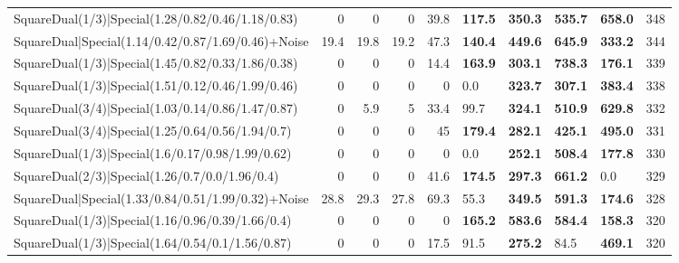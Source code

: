 \begin{tabular}{lrrrrllllr}
 SquareDual(1/3)|Special(1.28/0.82/0.46/1.18/0.83)       &          0   &          0   &          0   &            39.8 & \textbf{117.5} & \textbf{350.3} & \textbf{535.7} & \textbf{658.0}  &          348 \\
 SquareDual|Special(1.14/0.42/0.87/1.69/0.46)+Noise      &         19.4 &         19.8 &         19.2 &            47.3 & \textbf{140.4} & \textbf{449.6} & \textbf{645.9} & \textbf{333.2}  &          344 \\
 SquareDual(1/3)|Special(1.45/0.82/0.33/1.86/0.38)       &          0   &          0   &          0   &            14.4 & \textbf{163.9} & \textbf{303.1} & \textbf{738.3} & \textbf{176.1}  &          339 \\
 SquareDual(1/3)|Special(1.51/0.12/0.46/1.99/0.46)       &          0   &          0   &          0   &             0   & 0.0            & \textbf{323.7} & \textbf{307.1} & \textbf{383.4}  &          338 \\
 SquareDual(3/4)|Special(1.03/0.14/0.86/1.47/0.87)       &          0   &          5.9 &          5   &            33.4 & 99.7           & \textbf{324.1} & \textbf{510.9} & \textbf{629.8}  &          332 \\
 SquareDual(3/4)|Special(1.25/0.64/0.56/1.94/0.7)        &          0   &          0   &          0   &            45   & \textbf{179.4} & \textbf{282.1} & \textbf{425.1} & \textbf{495.0}  &          331 \\
 SquareDual(1/3)|Special(1.6/0.17/0.98/1.99/0.62)        &          0   &          0   &          0   &             0   & 0.0            & \textbf{252.1} & \textbf{508.4} & \textbf{177.8}  &          330 \\
 SquareDual(2/3)|Special(1.26/0.7/0.0/1.96/0.4)          &          0   &          0   &          0   &            41.6 & \textbf{174.5} & \textbf{297.3} & \textbf{661.2} & 0.0             &          329 \\
 SquareDual|Special(1.33/0.84/0.51/1.99/0.32)+Noise      &         28.8 &         29.3 &         27.8 &            69.3 & 55.3           & \textbf{349.5} & \textbf{591.3} & \textbf{174.6}  &          328 \\
 SquareDual(1/3)|Special(1.16/0.96/0.39/1.66/0.4)        &          0   &          0   &          0   &             0   & \textbf{165.2} & \textbf{583.6} & \textbf{584.4} & \textbf{158.3}  &          320 \\
 SquareDual(1/3)|Special(1.64/0.54/0.1/1.56/0.87)        &          0   &          0   &          0   &            17.5 & 91.5           & \textbf{275.2} & 84.5           & \textbf{469.1}  &          320 \\

\end{tabular}
